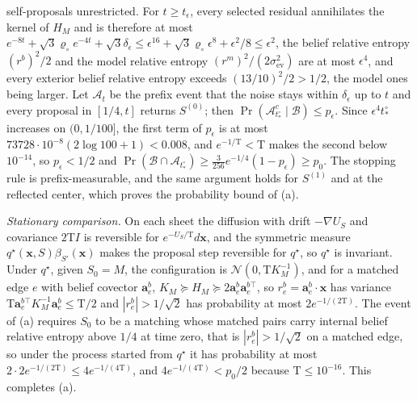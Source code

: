 self-proposals unrestricted. For \(t\ge t_\epsilon\), every selected residual
annihilates the kernel of \(H_M\) and is therefore at most
\(e^{-8t}+\sqrt3\varrho_\circ e^{-4t}+\sqrt3\delta_\epsilon\le
\epsilon^{16}+\sqrt3\varrho_\circ\epsilon^8+\epsilon^2/8\le\epsilon^2\), the belief
relative entropy \((r^b)^2/2\) and the model relative entropy
\((r^m)^2/(2\sigma^2_{\mathrm{ev}})\) are at most \(\epsilon^4\), and every
exterior belief relative entropy exceeds \((13/10)^2/2>1/2\), the model ones
being larger. Let \(\mathscr A_t\) be the prefix event that the noise stays
within \(\delta_\epsilon\) up to \(t\) and every proposal in \([1/4,t]\) returns
\(S^{(0)}\); then \(\Pr(\mathscr A_{t^\circ_*}^c\mid\mathscr B)\le p_\epsilon\).
Since \(\epsilon^4t^\circ_*\) increases on \((0,1/100]\), the first term of
\(p_\epsilon\) is at most \(73728\cdot10^{-8}(2\log100+1)<0.008\), and
\(e^{-1/\mathrm T}<\mathrm T\) makes the second below \(10^{-14}\), so
\(p_\epsilon<1/2\) and
\(\Pr(\mathscr B\cap\mathscr A_{t^\circ_*})\ge\tfrac3{256}e^{-1/4}(1-p_\epsilon)\ge p_0\).
The stopping rule is prefix-measurable, and the same argument holds for
\(S^{(1)}\) and at the reflected center, which proves the probability bound
of (a).

\emph{Stationary comparison.} On each sheet the diffusion with drift
\(-\nabla U_S\) and covariance \(2\mathrm TI\) is reversible for
\(e^{-U_S/\mathrm T}d\mathbf x\), and the symmetric measure
\(q^\star(\mathbf x,S)\beta_{S'}(\mathbf x)\) makes the proposal step
reversible for \(q^\star\), so \(q^\star\) is invariant. Under \(q^\star\),
given \(S_0=M\), the configuration is \(\mathcal N(0,\mathrm TK_M^{-1})\), and
for a matched edge \(e\) with belief covector \(\mathbf a^b_e\),
\(K_M\succeq H_M\succeq2\mathbf a^b_e\mathbf a^{b\top}_e\), so
\(r^b_e=\mathbf a^b_e\cdot\mathbf x\) has variance
\(\mathrm T\mathbf a^{b\top}_eK_M^{-1}\mathbf a^b_e\le\mathrm T/2\) and
\(|r^b_e|>1/\sqrt2\) has probability at most \(2e^{-1/(2\mathrm T)}\). The
event of (a) requires \(S_0\) to be a matching whose matched pairs carry
internal belief relative entropy above \(1/4\) at time zero, that is
\(|r^b_e|>1/\sqrt2\) on a matched edge, so under the process started from
\(q^\star\) it has probability at most \(2\cdot2e^{-1/(2\mathrm T)}\le4e^{-1/(4\mathrm T)}\),
and \(4e^{-1/(4\mathrm T)}<p_0/2\) because \(\mathrm T\le10^{-16}\). This
completes (a).

